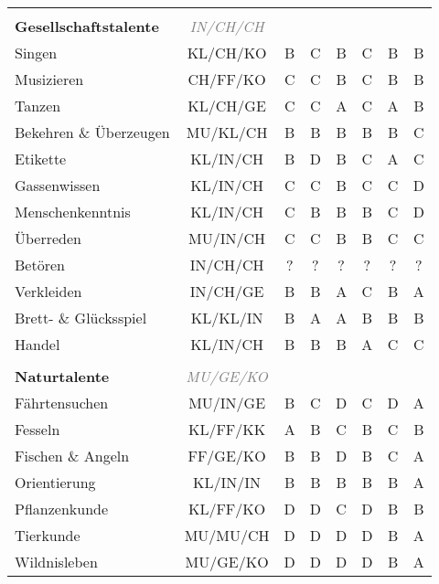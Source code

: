 \begin{center}
\begin{longtable}{|l|c|c|c|c|c|c|c|}
\hline
\multicolumn{8}{|l|}{} \\
\multicolumn{1}{|l}{\textbf{Gesellschaftstalente}} & \multicolumn{1}{c}{\textcolor{gray}{\textit{IN/CH/CH}}} & \multicolumn{6}{r|}{} \\
\hline
Singen\footnotemark[1] & KL/CH/KO & B & C & B & C & B & B \\
\hline
Musizieren & CH/FF/KO & C & C & B & C & B & B \\
\hline
Tanzen & KL/CH/GE & C & C & A & C & A & B \\
\hline
Bekehren \& Überzeugen & MU/KL/CH & B & B & B & B & B & C \\
\hline
Etikette\footnotemark[1] & KL/IN/CH & B & D & B & C & A & C \\
\hline
Gassenwissen & KL/IN/CH & C & C & B & C & C & D \\
\hline
Menschenkenntnis & KL/IN/CH & C & B & B & B & C & D \\
\hline
Überreden & MU/IN/CH & C & C & B & B & C & C \\
\hline
Betören\footnotemark[1] & IN/CH/CH & ? & ? & ? & ? & ? & ? \\
\hline
Verkleiden & IN/CH/GE & B & B & A & C & B & A \\
\hline
Brett- \& Glücksspiel & KL/KL/IN & B & A & A & B & B & B \\
\hline
Handel\footnotemark[1] & KL/IN/CH & B & B & B & A & C & C \\


\hline
\multicolumn{8}{|l|}{} \\
\hline
\multicolumn{1}{|l}{\textbf{Naturtalente}} & \multicolumn{1}{c}{\textcolor{gray}{\textit{MU/GE/KO}}} & \multicolumn{6}{r|}{} \\
\hline
Fährtensuchen & MU/IN/GE & B & C & D & C & D & A \\
\hline
Fesseln & KL/FF/KK & A & B & C & B & C & B \\
\hline
Fischen \& Angeln & FF/GE/KO & B & B & D & B & C & A \\
\hline
Orientierung & KL/IN/IN & B & B & B & B & B & A \\
\hline
Pflanzenkunde & KL/FF/KO & D & D & C & D & B & B \\
\hline
Tierkunde & MU/MU/CH & D & D & D & D & B & A \\
\hline
Wildnisleben & MU/GE/KO & D & D & D & D & B & A \\



\end{longtable}
\end{center}
